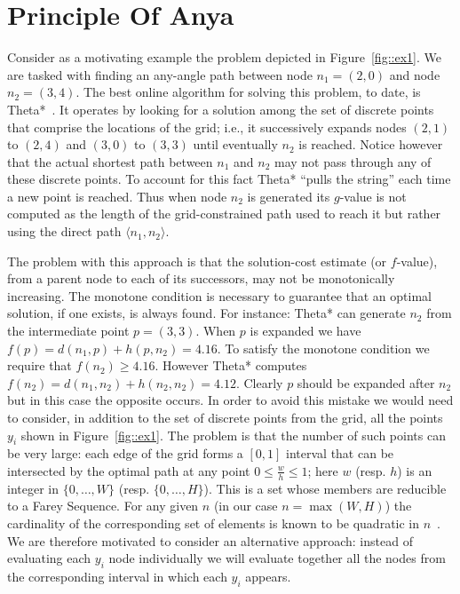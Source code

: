 \section{Principle Of Anya}
Consider as a motivating example the problem depicted in Figure~\ref{fig::ex1}.
We are tasked with finding an any-angle path between node $n_1 = (2, 0)$ and
node $n_2 = (3, 4)$.  The best online algorithm for solving this problem, to
date, is Theta*~\cite{nash07}. It operates by looking for a solution among the
set of discrete points that comprise the locations of the grid; i.e.,
it successively expands nodes $(2,1)$ to $(2,4)$ and $(3,0)$ to $(3,3)$ until
eventually $n_2$ is reached.  Notice however that the actual shortest path
between $n_1$ and $n_2$ may not pass through any of these discrete points.  To
account for this fact Theta* ``pulls the string'' each time a new
point is reached.  Thus when node $n_2$ is generated its $g$-value is not
computed as the length of the grid-constrained path used to reach it but rather
using the direct path $\langle n_1, n_2 \rangle$.

%    

The problem with this approach is that the solution-cost estimate
(or $f$-value), from a parent node to each of its successors, may 
not be monotonically increasing.  The monotone condition is
necessary to guarantee that an optimal solution, if one exists, is always found.
For instance: Theta* can generate $n_2$ from the intermediate point $p = (3,3)$.
When $p$ is expanded we have $f(p) = d(n_1, p) + h(p, n_2) = 4.16$. 
To satisfy the monotone condition we require that $f(n_2) \geq 4.16$. However 
Theta* computes $f(n_2) = d(n_1, n_2) + h(n_2, n_2) = 4.12$.
Clearly $p$ should be expanded after $n_2$ but in this case the opposite occurs.  
In order to avoid this mistake we would need to consider, in addition to the
set of discrete points from the grid, all the points $y_i$ shown in Figure~\ref{fig::ex1}.
The problem is that the number of such points can be very large:
each edge of the grid forms a $[0, 1]$ interval that can be intersected by the optimal
path at any point $0 \leq \frac{w}{h} \leq 1$; here $w$ (resp. $h$) is an integer in
$\{0,\dots,W\}$ (resp.  $\{0,\dots,H\}$).
This is a set whose members are reducible to a Farey Sequence.
For any given $n$ (in our case $n = \max(W, H)$) the cardinality of the corresponding 
set of elements is known to be quadratic in $n$~\cite{concrete89}.
We are therefore motivated to consider an alternative approach: instead
of evaluating each $y_i$ node individually we will evaluate together
all the nodes from the corresponding interval in which each $y_i$ appears.


